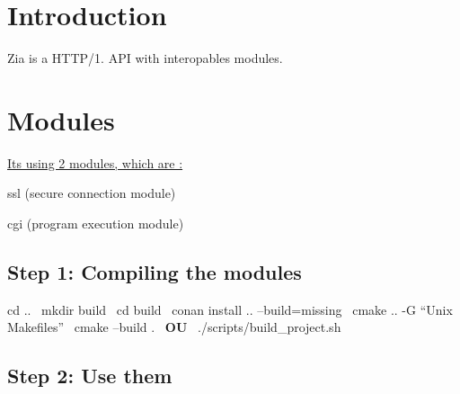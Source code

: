 \hypertarget{index_intro_sec}{}\section{Introduction}\label{index_intro_sec}
Zia is a H\+T\+T\+P/1. A\+PI with interopables modules.\hypertarget{index_modules_sec}{}\section{Modules}\label{index_modules_sec}
\uline{It\textquotesingle{}s using 2 modules, which are \+:}~\newline

\begin{DoxyItemize}
\item ssl (secure connection module)
\item cgi (program execution module) 
\end{DoxyItemize}\hypertarget{index_step1}{}\subsection{Step 1\+: Compiling the modules}\label{index_step1}
cd ..~\newline
 mkdir build~\newline
 cd build~\newline
 conan install .. --build=missing~\newline
 cmake .. -\/G “\+Unix Makefiles”~\newline
 cmake --build .~\newline
 {\bfseries{OU}}~\newline
 ./scripts/build\+\_\+project.sh~\newline
 \hypertarget{index_step2}{}\subsection{Step 2\+: Use them}\label{index_step2}
